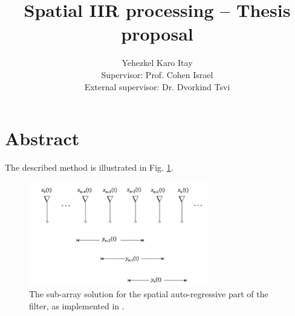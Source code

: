 \documentclass[a4paper,12pt,oneside]{report}
\author{
Yehezkel Karo Itay\\[1cm]{Supervisor: Prof. Cohen Israel}\\{External supervisor: Dr. Dvorkind Tsvi}
}
\title{Spatial IIR processing – Thesis proposal}
\begin{document}
\maketitle
\sloppy 
 \par
\noindent 
\section*{Abstract}

The described method is illustrated in Fig. \ref{fig:SpatialIIR_SubArrays}.
\begin{figure}[!h]
\begin{center}
\includegraphics[width=0.7\textwidth]{./Media/SpatialIIR_SubArrays.PNG}
\caption{The sub-array solution for the spatial auto-regressive part of the filter, as implemented in \cite{wen2013array}.}
\label{fig:SpatialIIR_SubArrays}
\end{center}
\end{figure}

\end{document}
